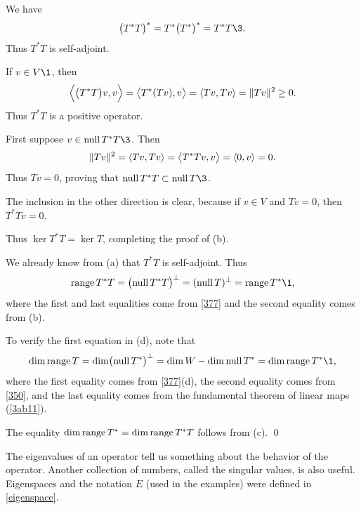 \proof
\begin{subtheorem}
\item
We have
\[
\paren[\big]{T^* T}^* = T^* \paren[\big]{T^*}^* = T^* T\3.
\]
Thus $T^* T$ is self-adjoint.

If $v \in V\1$, then
\[
\ip[\Big]{\paren[\big]{T^*T}v , v} = \ip[\big]{ T^*(Tv), v} = \ip{Tv, Tv} = \|Tv\|^2 \ge 0.
\]
Thus $T^* T$ is a positive operator.

\item
First suppose $v \in \ker T^*T\3$. Then
\[
\norm{Tv}^2 = \ip{Tv, Tv} = \ip[\big]{T^*Tv, v} = \ip{0, v} = 0.
\]
Thus $Tv = 0$, proving that $\ker T^*T \subset \ker T\3$.

The inclusion in the other direction is clear, because if $v \in V$ and $Tv = 0$, then $T^*Tv = 0$.

Thus $\ker T^*T = \ker T$, completing the proof of (b).

\item
We already know from (a) that $T^*T$ is self-adjoint. Thus
\[
\ran T^* T = \paren[\big]{\ker T^* T}^\perp = (\ker T)^\perp = \ran T^*\1,
\]
where the first and last equalities come from \ref{377} and the second equality comes from (b).

\item
To verify the first equation in (d), note that
\[
\dim \ran T = \dim \paren[\big]{\ker T^*}^\perp = \dim W - \dim \ker T^* = \dim \ran T^*\1,
\]
where the first equality comes from \ref{377}(d), the second equality comes from \ref{350}, and the last equality comes from the fundamental theorem of linear maps (\ref{3ab11}).

The equality $\dim \ran T^* = \dim \ran T^* T$ follows from (c).
\qed
\end{subtheorem}

The eigenvalues of an operator tell us something about the behavior of the operator. Another collection of numbers, called the singular values, is also useful. Eigenspaces and the notation $E$ (used in the examples) were defined in \ref{eigenspace}.


